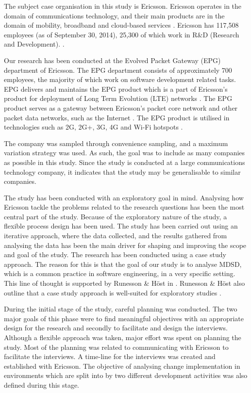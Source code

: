 \documentclass[10pt,twocolumn]{article}
\begin{document}

The subject case organisation in this study is Ericsson. Ericsson operates in the domain of communications technology, and their main products are in the domain of mobility, broadband and cloud-based services \cite{a7} \cite{a8}. Ericsson has 117,508 employees (as of September 30, 2014), 25,300 of which work in R\&D (Research and Development). \cite{a7}. 

Our research has been conducted at the Evolved Packet Gateway (EPG) department of Ericsson. The EPG department consists of approximately 700 employees, the majority of which work on software development related tasks. EPG delivers and maintains the EPG product which is a part of Ericsson's product for deployment of Long Term Evolution (LTE) networks \cite{a9}. The EPG product serves as a gateway between Ericsson's packet core network and other packet data networks, such as the Internet \cite{a9}. The EPG product is utilised in technologies such as 2G, 2G+, 3G, 4G and Wi-Fi hotspots \cite{a9}. 

The company was sampled through convenience sampling, and a maximum variation strategy was used. As such, the goal was to include as many companies as possible in this study. Since the study is conducted at a large communications technology company, it indicates that the study may be generalisable to similar companies. 

The study has been conducted with an exploratory goal in mind. Analysing how Ericsson tackle the problems related to the research questions has been the most central part of the study. Because of the exploratory nature of the study, a flexible process design has been used. The study has been carried out using an iterative approach, where the data collected, and the results gathered from analysing the data has been the main driver for shaping and improving the scope and goal of the study. The research has been conducted using a case study approach. The reason for this is that the goal of our study is to analyse MDSD, which is a common practice in software engineering, in a very specific setting. This line of thought is supported by Runesson \& Höst in \cite{runeson2009guidelines}. Runesson \& Höst also outline that a case study approach is well-suited for exploratory studies \cite{runeson2009guidelines}. 

During the initial stage of the study, careful planning was conducted. The two major goals of this phase were to find meaningful objectives with an appropriate design for the research and secondly to facilitate and design the interviews. Although a flexible approach was taken, major effort was spent on planning the study. Most of the planning was related to communicating with Ericsson to facilitate the interviews. A time-line for the interviews was created and established with Ericsson. The objective of analysing change implementation in environments which are split into by two different development activities was also defined during this stage. 
\end{document}

